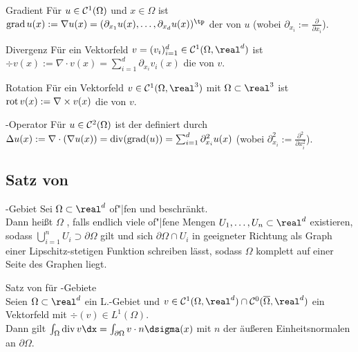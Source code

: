 \begin{Def}{Gradient}
    Für $u \in \mathcal{C}^1(\Omega)$ und $x \in \Omega$ ist
    $\grad u(x) := \nabla u(x) = (\partial_{x_1} u(x), \dotsc, \partial_{x_d} u(x))^\tp$
    der  von $u$ (wobei $\partial_{x_i} := \frac{\partial}{\partial x_i}$).
\end{Def}

\begin{Def}{Divergenz}
    Für ein Vektorfeld $v = (v_i)_{i=1}^d \in \C^1(\Omega, \real^d)$ ist\\
    $\div v(x) := \nabla \cdot v(x) = \sum_{i=1}^d \partial_{x_i} v_i(x)$
    die  von $v$.
\end{Def}

\begin{Def}{Rotation}
    Für ein Vektorfeld $v \in \C^1(\Omega, \real^3)$ mit $\Omega \subset \real^3$ ist\\
    $\operatorname{rot} v(x) := \nabla \times v(x)$ die  von $v$.
\end{Def}

\begin{Def}{-Operator}
    Für $u \in \mathcal{C}^2(\Omega)$ ist der  definiert durch\\
    $\Delta u(x) := \nabla \cdot (\nabla u(x)) = \operatorname{div}(\operatorname{grad}(u)) =
    \sum_{i=1}^d \partial_{x_i}^2 u(x)$
    (wobei $\partial_{x_i}^2 := \frac{\partial^2}{\partial x_i^2}$).
\end{Def}

\subsection{%
    Satz von %
}

\begin{Def}{-Gebiet}
    Sei $\Omega \subset \real^d$ of"|fen und beschränkt.\\
    Dann heißt $\Omega$ , falls endlich viele
    of"|fene Mengen $U_1, \dotsc, U_n \subset \real^d$ existieren, sodass
    $\bigcup_{i=1}^n U_i \supset \partial\Omega$ gilt und
    sich $\partial\Omega \cap U_i$ in geeigneter Richtung als Graph einer Lipschitz-stetigen
    Funktion schreiben lässt, sodass $\Omega$ komplett auf einer Seite des Graphen liegt.
\end{Def}

\begin{Satz}{Satz von  für -Gebiete}\\
    Seien $\Omega \subset \real^d$ ein L.-Gebiet und
    $v \in \C^1(\Omega, \real^d) \cap \C^0(\overline{\Omega}, \real^d)$ ein Vektorfeld mit
    $\div(v) \in L^1(\Omega)$.\\
    Dann gilt $\int_\Omega \div v \dx = \int_{\partial\Omega} v \cdot n \dsigma(x)$ mit
    $n$ der äußeren Einheitsnormalen an $\partial\Omega$.
\end{Satz}

